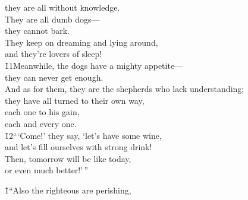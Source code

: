 \begin{poetry}
\poemll    they are all without knowledge. \\
\poeml They are all dumb dogs--- \\
\poemll    they cannot bark. \\
\poeml They keep on dreaming and lying around, \\
\poemll    and they're lovers of sleep! \\
\poeml \v{11}Meanwhile, the dogs have a mighty appetite--- \\
\poemll    they can never get enough. \\
\poeml And as for them, they are the shepherds who lack understanding; \\
\poemll    they have all turned to their own way, \\
\poeml each one to his gain, \\
\poemll    each and every one. \\
\poeml \v{12}```Come!' they say, `let's have some wine, \\
\poemll    and let's fill ourselves with strong drink! \\
\poeml Then, tomorrow will be like today, \\
\poemll    or even much better!'\,''
\end{poetry}

\v{1}``Also the righteous are perishing,

